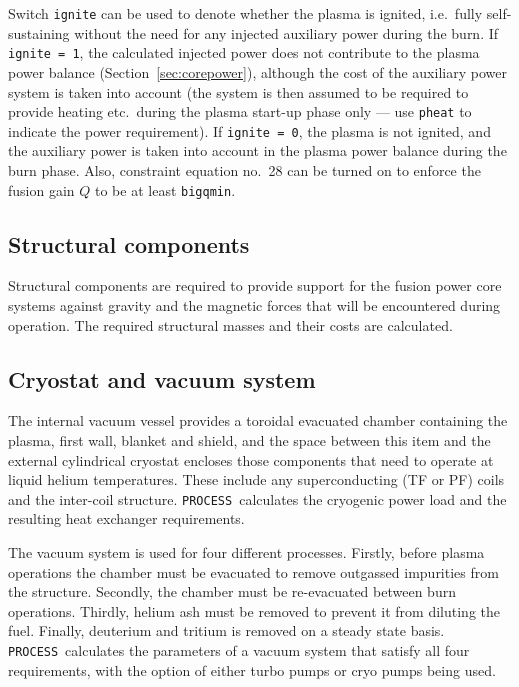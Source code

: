 \documentclass[11pt,a4paper]{report}
\newcommand{\process}{\mbox{\texttt{PROCESS}}}
\begin{document}
Switch \texttt{ignite} can be used to denote whether the plasma is ignited,
i.e.\ fully self-sustaining without the need for any injected auxiliary power
during the burn. If \texttt{ignite = 1}, the calculated injected power does
not contribute to the plasma power balance (Section~\ref{sec:corepower}),
although the cost of the auxiliary power system is taken into account (the
system is then assumed to be required to provide heating etc.\ during the
plasma start-up phase only --- use \texttt{pheat} to indicate the power
requirement). If \texttt{ignite = 0}, the plasma is not ignited, and the
auxiliary power is taken into account in the plasma power balance during the
burn phase. Also, constraint equation no.\ 28 can be turned on to enforce the
fusion gain $Q$ to be at least \texttt{bigqmin}.

\subsection{Structural components}

Structural components are required to provide support for the fusion power
core systems against gravity and the magnetic forces that will be encountered
during operation. The required structural masses and their costs are
calculated.

\subsection{Cryostat and vacuum system}

The internal vacuum vessel provides a toroidal evacuated chamber containing
the plasma, first wall, blanket and shield, and the space between this item
and the external cylindrical cryostat encloses those components that need to
operate at liquid helium temperatures. These include any superconducting (TF
or PF) coils and the inter-coil structure. \process\ calculates the cryogenic
power load and the resulting heat exchanger requirements.

The vacuum system is used for four different processes. Firstly, before plasma
operations the chamber must be evacuated to remove outgassed impurities from
the structure. Secondly, the chamber must be re-evacuated between burn
operations. Thirdly, helium ash must be removed to prevent it from diluting
the fuel. Finally, deuterium and tritium is removed on a steady state
basis. \process\ calculates the parameters of a vacuum system that satisfy
all four requirements, with the option of either turbo pumps or cryo pumps
being used.
\end{document}
